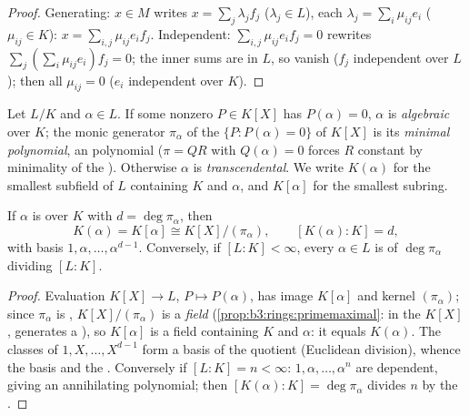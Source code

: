 \begin{proof}
Generating: $x \in M$ writes $x = \sum_j \lambda_jf_j$
($\lambda_j \in L$), each $\lambda_j = \sum_i \mu_{ij}e_i$
($\mu_{ij} \in K$): $x = \sum_{i,j}\mu_{ij}e_if_j$. Independent:
$\sum_{i,j}\mu_{ij}e_if_j = 0$ rewrites $\sum_j (\sum_i
\mu_{ij}e_i)f_j = 0$; the inner sums are in $L$, so vanish
($f_j$ independent over $L$); then all $\mu_{ij} = 0$ ($e_i$
independent over $K$).
\end{proof}

\begin{definition}\label{def:b3:galois:algebraic}
Let $L/K$ and $\alpha \in L$. If some nonzero $P \in K[X]$ has
$P(\alpha) = 0$, $\alpha$ is \emph{algebraic} over $K$; the monic generator $\pi_\alpha$ of the 
$\{P : P(\alpha) = 0\}$ of $K[X]$ is its \emph{minimal
polynomial}, an
 polynomial ($\pi = QR$ with $Q(\alpha) = 0$ forces $R$
constant by minimality of the ). Otherwise $\alpha$ is
\emph{transcendental}. We write $K(\alpha)$ for the smallest
subfield of $L$ containing $K$ and $\alpha$, and $K[\alpha]$ for
the smallest subring.
\end{definition}

\begin{theorem}\label{thm:b3:galois:simple}
If $\alpha$ is  over $K$ with $d = \deg\pi_\alpha$,
then
\[
K(\alpha) = K[\alpha] \cong K[X]/(\pi_\alpha),
\qquad [K(\alpha) : K] = d,
\]
with basis $1, \alpha, \dots, \alpha^{d-1}$. Conversely, if
$[L:K] < \infty$, every $\alpha \in L$ is  of 
$\deg \pi_\alpha$ dividing $[L:K]$.
\end{theorem}

\begin{proof}
Evaluation $K[X] \to L$, $P \mapsto P(\alpha)$, has image
$K[\alpha]$ and kernel $(\pi_\alpha)$; since $\pi_\alpha$ is
, $K[X]/(\pi_\alpha)$ is a \emph{field}
(\cref{prop:b3:rings:primemaximal}: in the  $K[X]$,
 generates a ), so $K[\alpha]$ is a field
containing $K$ and $\alpha$: it equals $K(\alpha)$. The classes
of $1, X, \dots, X^{d-1}$ form a basis of the quotient (Euclidean
division), whence the basis and the . Conversely if $[L:K]
= n < \infty$: $1, \alpha, \dots, \alpha^n$ are dependent, giving
an annihilating polynomial; then $[K(\alpha):K] =
\deg\pi_\alpha$ divides $n$ by the .
\end{proof}

